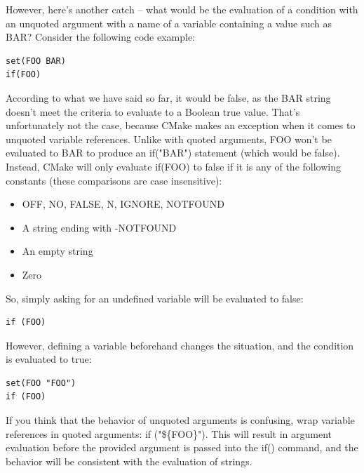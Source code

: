 However, here's another catch – what would be the evaluation of a condition with an unquoted argument with a name of a variable containing a value such as BAR? Consider the following code example:

\begin{lstlisting}[style=styleCMake]
set(FOO BAR)
if(FOO)
\end{lstlisting}

According to what we have said so far, it would be false, as the BAR string doesn't meet the criteria to evaluate to a Boolean true value. That's unfortunately not the case, because CMake makes an exception when it comes to unquoted variable references. Unlike with quoted arguments, FOO won't be evaluated to BAR to produce an if("BAR") statement (which would be false). Instead, CMake will only evaluate if(FOO) to false if it is any of the following constants (these comparisons are case insensitive):

\begin{itemize}
\item 
OFF, NO, FALSE, N, IGNORE, NOTFOUND

\item 
A string ending with -NOTFOUND

\item 
An empty string

\item 
Zero
\end{itemize}

So, simply asking for an undefined variable will be evaluated to false:

\begin{lstlisting}[style=styleCMake]
if (FOO)
\end{lstlisting}

However, defining a variable beforehand changes the situation, and the condition is evaluated to true:

\begin{lstlisting}[style=styleCMake]
set(FOO "FOO")
if (FOO)
\end{lstlisting}

\begin{tcolorbox}[colback=blue!5!white,colframe=blue!75!black,title=Note]
If you think that the behavior of unquoted arguments is confusing, wrap variable references in quoted arguments: if ("\$\{FOO\}"). This will result in argument evaluation before the provided argument is passed into the if() command, and the behavior will be consistent with the evaluation of strings.
\end{tcolorbox}

